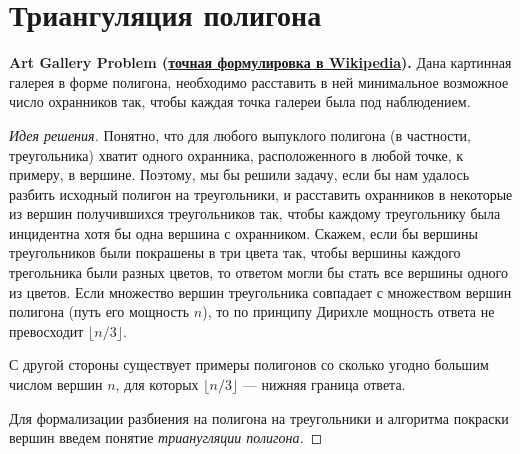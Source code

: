 \section{Триангуляция полигона}

\textbf{Art Gallery Problem (\href{http://en.wikipedia.org/wiki/Art_gallery_problem}{точная формулировка в Wikipedia}).} 
Дана картинная галерея в форме полигона, необходимо расставить в ней минимальное возможное число охранников так, 
чтобы каждая точка галереи была под наблюдением.
\begin{proof}[Идея решения]
Понятно, что для любого выпуклого полигона (в частности, треугольника) хватит одного охранника, 
расположенного в любой точке, к примеру, в вершине. Поэтому, мы бы решили задачу, если бы нам удалось разбить исходный полигон 
на треугольники, и расставить охранников в некоторые из вершин получившихся треугольников так, чтобы каждому треугольнику была
инцидентна хотя бы одна вершина с охранником. Скажем, если бы вершины треугольников были покрашены в три цвета
так, чтобы вершины каждого трегольника были разных цветов, то ответом могли бы стать все вершины одного из цветов. 
Если множество вершин треугольника совпадает с множеством вершин полигона (путь его мощность $n$), то по принципу Дирихле 
мощность ответа не превосходит $\lfloor n / 3 \rfloor$. 

С другой стороны существует примеры полигонов со сколько угодно большим числом вершин $n$, для которых $\lfloor n / 3 \rfloor$ ---
нижняя граница ответа.

Для формализации разбиения на полигона на треугольники и алгоритма покраски вершин введем понятие \itshape{трианугляции полигона}.
\end{proof}

